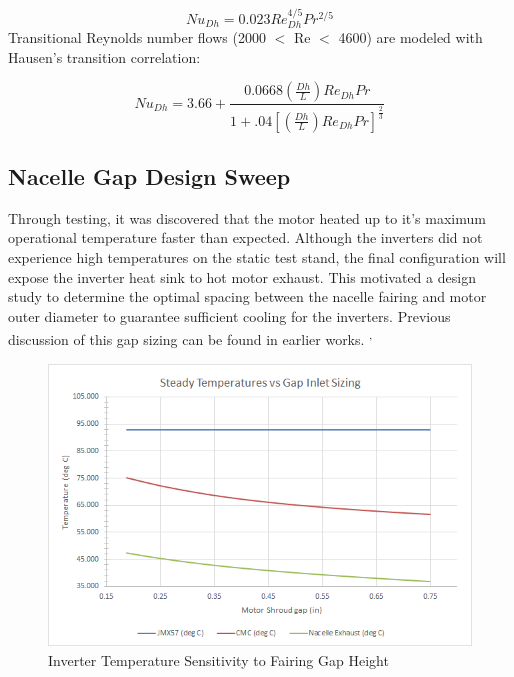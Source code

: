 \documentclass[]{aiaa-tc}%
\begin{document}
\begin{equation}
Nu_{Dh} = 0.023Re_{Dh}^{4/5}Pr^{2/5}
\label{eq:dittus_boelter}
\end{equation}
Transitional Reynolds number flows (2000 $<$ Re $<$ 4600) are modeled with Hausen’s transition correlation\cite{Kays}:

\begin{equation}
Nu_{Dh} = 3.66+\frac{0.0668\left ( \frac{Dh}{L} \right )Re_{Dh}Pr}{1+.04\left [ \left ( \frac{Dh}{L} \right )Re_{Dh}Pr \right ]^\frac{2}{3}}
\label{eq:Hausens}
\end{equation}

\subsection{Nacelle Gap Design Sweep}

Through testing, it was discovered that the motor heated up to it's maximum operational temperature faster than expected. Although the inverters did not experience high temperatures on the static test stand, the final configuration will expose the inverter heat sink to hot motor exhaust. This motivated a design study to determine the optimal spacing between the nacelle fairing and motor outer diameter to guarantee sufficient cooling for the inverters. Previous discussion of this gap sizing can be found in earlier works. \cite{Schnulo}\textsuperscript{,} \cite{Chin}

\begin{figure}[!htb]%
	\centering
	\includegraphics[width=.75\textwidth]{figures/gapsweep_results.png}
	\caption{Inverter Temperature Sensitivity to Fairing Gap Height}
	\label{fig:GapSweep}
\end{figure}
\end{document}

